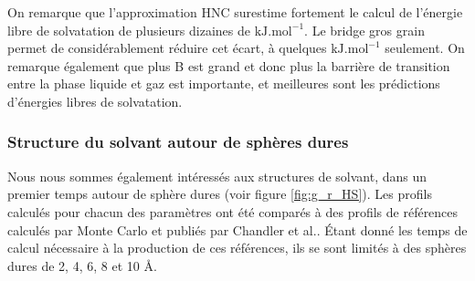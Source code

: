 On remarque que l'approximation HNC surestime fortement le calcul de l'énergie libre de solvatation de plusieurs dizaines de $\mathrm{kJ.mol}^{-1}$. Le bridge gros grain permet de considérablement réduire cet écart, à quelques $\mathrm{kJ.mol}^{-1}$ seulement.
On remarque également que plus B est grand et donc plus la barrière de transition entre la phase liquide et gaz est importante, et meilleures sont les prédictions d'énergies libres de solvatation. 




\subsubsection{ Structure du solvant autour de sphères dures }
Nous nous sommes également intéressés aux structures de solvant, dans un premier temps autour de sphère dures (voir figure \ref{fig:g_r_HS}). Les profils calculés pour chacun des paramètres ont été comparés à des profils de références calculés par Monte Carlo et publiés par Chandler et al.\cite{huang_hydrophobic_2002}. \'Etant donné les temps de calcul nécessaire à la production de ces références, ils se sont limités à des sphères dures de 2, 4, 6, 8 et 10 \AA.




